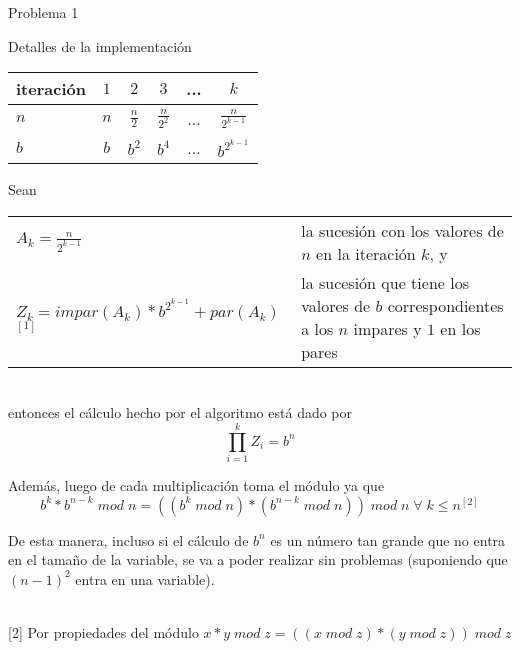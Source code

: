 \begin{section}{Problema 1}
\begin{subsection}{Detalles de la implementación}
		\vspace{0.5cm}
		\begin{center}
		\begin{tabular}{|l|c|c|c|c|c|}
			\hline
			iteración   & $1$ & $2$           & $3$             & ... & $k$ \\
			\hline
			$n$         & $n$ & $\frac{n}{2}$ & $\frac{n}{2^2}$ & ... & $\frac{n}{2^{k-1}}$ \\
			\hline
			$b$         & $b$ & $b^2$         & $b^4$           & ... & $b^{2^{k-1}}$ \\
			\hline
		\end{tabular}
		\end{center}

		\vspace{0.5cm}
		\noindent Sean \\
		\indent
		\begin{tabular}{lp{6cm}}
			$A_k = \frac{n}{2^{k-1}}$ & la sucesión con los valores de $n$ en la iteración $k$, y \\
			$Z_k = impar(A_k) * b^{2^{k-1}} + par( A_k )$ $^{[1]}$ & la sucesión que tiene los valores de $b$ corres\-pondientes a los $n$ impares y $1$ en los pares
		\end{tabular} \\
		\vspace{0.2cm}
		entonces el cálculo hecho por el algoritmo está dado por 
		$$\displaystyle\prod_{i=1}^k Z_i = b^n$$

\noindent Además, luego de cada multiplicación toma el módulo ya que
 $$b^k * b^{n-k}\; mod\;n = ((b^k\;mod\;n)*(b^{n-k}\;mod\;n))\;mod\;n\;\forall\;k\leq n ^{[2]}$$

De esta manera, incluso si el cálculo de $b^n$ es un número tan grande que no entra en el tamaño de la variable, se va a poder realizar sin problemas (suponiendo que $(n-1)^2$ entra en una variable).

\vspace{0.5cm}
 \\
{\footnotesize [2] Por propiedades del módulo $x*y\; mod \; z = ((x\; mod\; z)*(y\; mod\; z))\;mod\; z$ } \\



\end{subsection}
\end{section}
